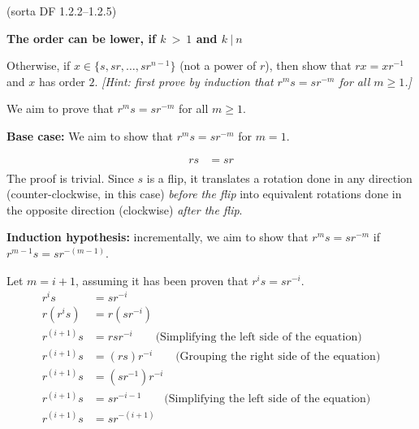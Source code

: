\begin{problem}{\textsf{(sorta DF 1.2.2--1.2.5)}}
\begin{enumalph}
\begin{Answer}
    \noindent
    \textbf{The order can be lower, if $k\ >\ 1$ and $k\ |\ n$}
  \end{Answer}
  \item Otherwise, if $x \in \{s,sr,\dots,sr^{n-1}\}$ (not a power of $r$), then show
  that $rx=xr^{-1}$ and $x$ has order $2$.  \emph{[Hint: first prove by induction 
  that $r^m s = s r^{-m}$ for all $m \geq 1$.]}
  \begin{Answer}
    We aim to prove that $r^m s = s r^{-m}$ for all $m \geq 1$.

    \noindent
    \textbf{Base case:} We aim to show that $r^m s = sr^{-m}$ for $m = 1$.

    \begin{align*}
      rs &= sr\\
    \end{align*}
    The proof is trivial. Since $s$ is a flip, it translates a rotation done in any direction (counter-clockwise, in this case)
    \textit{before the flip} into equivalent rotations done in the opposite direction (clockwise) \textit{after the flip}. 
    
    \bigskip
    \noindent
    \textbf{Induction hypothesis:} incrementally, we aim to show that $r^{m}s = sr^{-m}$
    if $r^{m-1}s = sr^{-(m-1)}$.

    \noindent
    Let $m = i + 1$, assuming it has been proven that $r^{i}s = sr^{-i}$.
    \begin{align*}
      r^i s &= sr^{-i} \\
      r(r^i s) &= r(sr^{-i}) \\ 
      r^{(i+1)}s &= rsr^{-i} \qquad \text{(Simplifying the left side of the equation)} \\
      r^{(i+1)}s &= (rs)r^{-i} \qquad \text{(Grouping the right side of the equation)}\\
      r^{(i+1)}s &= (sr^{-1})r^{-i}\\
      r^{(i+1)}s &= sr^{-i-1} \qquad \text{(Simplifying the left side of the equation)}\\
      r^{(i+1)}s &= sr^{-(i+1)}\\
    \end{align*}


\end{Answer}
\end{enumalph}
\end{problem}
